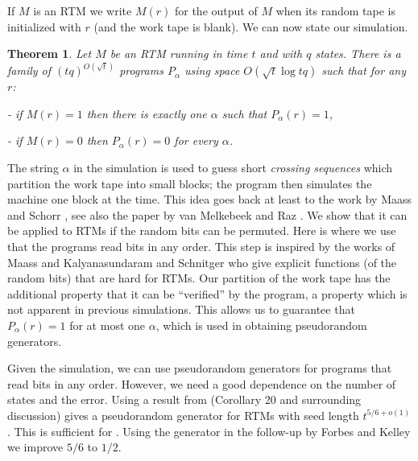 \documentclass{toc}
\newtheorem{thm}[theorem]{Theorem}
\begin{document}
If $M$ is an RTM we write $M(r)$ for the output of $M$ when its
random tape is initialized with $r$ (and the work tape is blank).
We can now state our simulation.
\begin{thm}
\label{thm:M-to-OR-BP}Let $M$ be an RTM running in time $t$ and
with $q$ states. There is a family of $(tq)^{O(\sqrt{t})}$ programs
$P_{\alpha}$ using space $O(\sqrt{t}\log tq)$ such that for any
$r$:

- if $M(r)=1$ then there is exactly one $\alpha$ such that $P_{\alpha}(r)=1$,

- if $M(r)=0$ then $P_{\alpha}(r)=0$ for every $\alpha$.
\end{thm}

The string $\alpha$ in the simulation is used to guess short \emph{crossing
sequences} which partition the work tape into small blocks; the program
then simulates the machine one block at the time. This idea goes back
at least to the work by Maass and Schorr \cite{MaS87}, see also the
paper by van Melkebeek and Raz \cite{DBLP:journals/tcs/MelkebeekR05}.
We show that it can be applied to RTMs if the random bits can be permuted.
Here is where we use that the programs read bits in any order. This
step is inspired by the works of Maass \cite{MR808746} and Kalyanasundaram
and Schnitger \cite{KalyanasundaramS92} who give explicit functions
(of the random bits) that are hard for RTMs. Our partition of the
work tape has the additional property that it can be ``verified''
by the program, a property which is not apparent in previous simulations.
This allows us to guarantee that $P_{\alpha}(r)=1$ for at most one
$\alpha$, which is used in obtaining pseudorandom generators.

\medskip

Given the simulation, we can use pseudorandom generators for programs
that read bits in any order. However, we need a good dependence on
the number of states and the error. Using a result from \cite{HLV-bipnfp}
(Corollary 20 and surrounding discussion) gives a pseudorandom generator
for RTMs with seed length $t^{5/6+o(1)}$. This is sufficient for
. Using the generator in the follow-up by
Forbes and Kelley \cite{ForbesKelley-2018} we improve $5/6$ to $1/2$.
\end{document}
